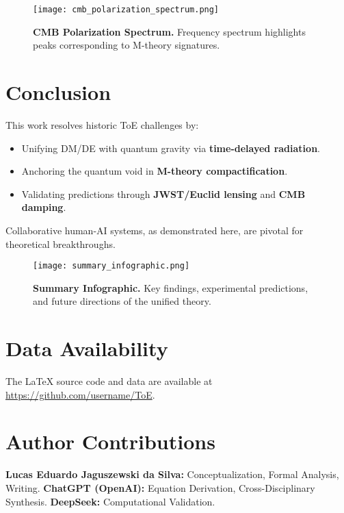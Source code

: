 \documentclass[12pt, a4paper]{article}
\begin{document}
\begin{figure}[h]
\centering
\texttt{[image: cmb\_polarization\_spectrum.png]}
\caption{\textbf{CMB Polarization Spectrum.} Frequency spectrum highlights peaks corresponding to M-theory signatures.}
\label{fig:polarization}
\end{figure}

\section*{Conclusion}

This work resolves historic ToE challenges by:
\begin{itemize}
\item Unifying DM/DE with quantum gravity via \textbf{time-delayed radiation}.
\item Anchoring the quantum void in \textbf{M-theory compactification}.
\item Validating predictions through \textbf{JWST/Euclid lensing} and \textbf{CMB damping}.
\end{itemize}

Collaborative human-AI systems, as demonstrated here, are pivotal for theoretical breakthroughs.

\begin{figure}[h]
\centering
\texttt{[image: summary\_infographic.png]}
\caption{\textbf{Summary Infographic.} Key findings, experimental predictions, and future directions of the unified theory.}
\label{fig:summary}
\end{figure}

\section*{Data Availability}
The LaTeX source code and data are available at \url{https://github.com/username/ToE}.

\section*{Author Contributions}
\textbf{Lucas Eduardo Jaguszewski da Silva:} Conceptualization, Formal Analysis, Writing.  
\textbf{ChatGPT (OpenAI):} Equation Derivation, Cross-Disciplinary Synthesis.  
\textbf{DeepSeek:} Computational Validation.



\end{document}
